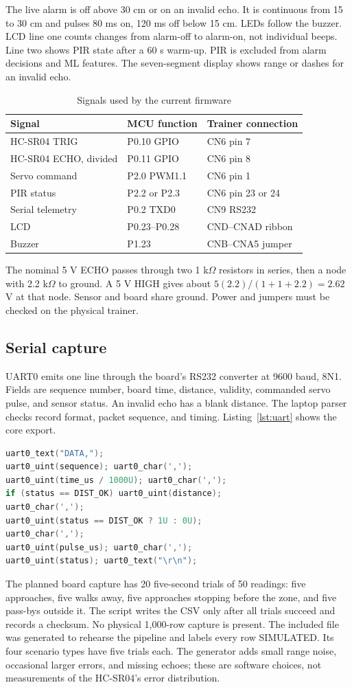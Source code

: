 \documentclass[conference]{IEEEtran}
\begin{document}
The live alarm is off above 30 cm or on an invalid echo. It is continuous from 15 to 30 cm and pulses 80 ms on, 120 ms off below 15 cm. LEDs follow the buzzer. LCD line one counts changes from alarm-off to alarm-on, not individual beeps. Line two shows PIR state after a 60 s warm-up. PIR is excluded from alarm decisions and ML features. The seven-segment display shows range or dashes for an invalid echo.
\begin{table}[t]\caption{Signals used by the current firmware}\label{tab:pins}\centering\footnotesize
\begin{tabular}{lll}\toprule
Signal & MCU function & Trainer connection\\\midrule
HC-SR04 TRIG & P0.10 GPIO & CN6 pin 7\\
HC-SR04 ECHO, divided & P0.11 GPIO & CN6 pin 8\\
Servo command & P2.0 PWM1.1 & CN6 pin 1\\
PIR status & P2.2 or P2.3 & CN6 pin 23 or 24\\
Serial telemetry & P0.2 TXD0 & CN9 RS232\\
LCD & P0.23--P0.28 & CND--CNAD ribbon\\
Buzzer & P1.23 & CNB--CNA5 jumper\\\bottomrule
\end{tabular}\end{table}
The nominal 5 V ECHO passes through two 1 k$\Omega$ resistors in series, then a node with 2.2 k$\Omega$ to ground. A 5 V HIGH gives about $5(2.2)/(1+1+2.2)=2.62$ V at that node. Sensor and board share ground. Power and jumpers must be checked on the physical trainer.
\subsection{Serial capture}
UART0 emits one line through the board's RS232 converter at 9600 baud, 8N1. Fields are sequence number, board time, distance, validity, commanded servo pulse, and sensor status. An invalid echo has a blank distance. The laptop parser checks record format, packet sequence, and timing. Listing~\ref{lst:uart} shows the core export.
\begin{lstlisting}[language=C,caption={Condensed UART record from main.c.},label={lst:uart}]
uart0_text("DATA,");
uart0_uint(sequence); uart0_char(',');
uart0_uint(time_us / 1000U); uart0_char(',');
if (status == DIST_OK) uart0_uint(distance);
uart0_char(',');
uart0_uint(status == DIST_OK ? 1U : 0U);
uart0_char(',');
uart0_uint(pulse_us); uart0_char(',');
uart0_uint(status); uart0_text("\r\n");
\end{lstlisting}
The planned board capture has 20 five-second trials of 50 readings: five approaches, five walks away, five approaches stopping before the zone, and five pass-bys outside it. The script writes the CSV only after all trials succeed and records a checksum. No physical 1,000-row capture is present. The included file was generated to rehearse the pipeline and labels every row SIMULATED. Its four scenario types have five trials each. The generator adds small range noise, occasional larger errors, and missing echoes; these are software choices, not measurements of the HC-SR04's error distribution.
\end{document}
